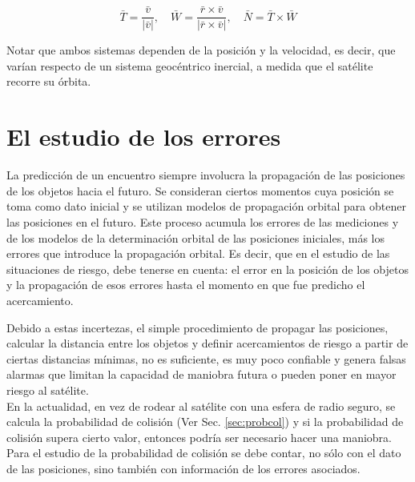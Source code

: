 \begin{equation}
 \bar{T}=\frac{\bar{v}}{|\bar{v}|}, \quad \bar{W}=\frac{\bar{r}\times\bar{v}}{|\bar{r}\times\bar{v}|}, \quad \bar{N}=\bar{T}\times\bar{W}
\end{equation}



Notar que ambos sistemas dependen de la posici\'on y la velocidad, es decir, que var\'ian respecto de un sistema geoc\'entrico inercial, a medida que el sat\'elite recorre su \'orbita.\\





\section{El estudio de los errores}

La predicci\'on de un encuentro siempre involucra la propagaci\'on de las posiciones de los objetos hacia el futuro. Se consideran ciertos momentos cuya posici\'on se toma como dato inicial y se utilizan modelos de propagaci\'on orbital para obtener las posiciones en el futuro. Este proceso acumula los errores de las mediciones y de los modelos de la determinaci\'on orbital de las posiciones iniciales, m\'as los errores que introduce la propagaci\'on orbital. Es decir, que en el estudio de las situaciones de riesgo, debe tenerse en cuenta: el error en la posici\'on de los objetos y la propagaci\'on de esos errores hasta el momento en que fue predicho el acercamiento.\\

{\color{red}{Esquema}}

Debido a estas incertezas, el simple procedimiento de propagar las posiciones, calcular la distancia entre los objetos y definir acercamientos de riesgo a partir de ciertas distancias m\'inimas, no es suficiente, es muy poco confiable y genera falsas alarmas que limitan la capacidad de maniobra futura o pueden poner en mayor riesgo al sat\'elite.\\

En la actualidad, en vez de rodear al sat\'elite con una esfera de radio seguro, se calcula la probabilidad de colisi\'on (Ver Sec. \ref{sec:probcol}) y si la probabilidad de colisi\'on supera cierto valor, entonces podr\'ia ser necesario hacer una maniobra. Para el estudio de la probabilidad de colisi\'on se debe contar, no s\'olo con el dato de las posiciones, sino tambi\'en con informaci\'on de los errores asociados.\\

